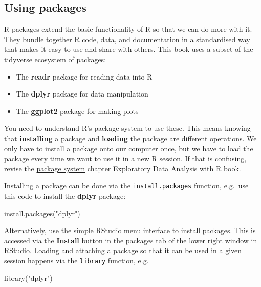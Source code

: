 \documentclass[
]{book}
\newenvironment{Shaded}{\begin{snugshade}}{\end{snugshade}}
\newcommand{\FunctionTok}[1]{\textcolor[rgb]{0.00,0.00,0.00}{#1}}
\newcommand{\NormalTok}[1]{#1}
\newcommand{\StringTok}[1]{\textcolor[rgb]{0.31,0.60,0.02}{#1}}
\providecommand{\tightlist}{%
  \setlength{\itemsep}{0pt}\setlength{\parskip}{0pt}}
\begin{document}
\hypertarget{using-packages}{%
\subsection*{Using packages}\label{using-packages}}

R packages extend the basic functionality of R so that we can do more with it. They bundle together R code, data, and documentation in a standardised way that makes it easy to use and share with others. This book uses a subset of the \href{https://www.tidyverse.org}{tidyverse} ecosystem of packages:

\begin{itemize}
\tightlist
\item
  The \textbf{readr} package for reading data into R
\item
  The \textbf{dplyr} package for data manipulation
\item
  The \textbf{ggplot2} package for making plots
\end{itemize}

You need to understand R's package system to use these. This means knowing that \textbf{installing} a package and \textbf{loading} the package are different operations. We only have to install a package onto our computer once, but we have to load the package every time we want to use it in a new R session. If that is confusing, revise the \href{https://tuos-bio-data-skills.github.io/intro-eda-book/packages.html}{package system} chapter Exploratory Data Analysis with R book.

Installing a package can be done via the \texttt{install.packages} function, e.g.~use this code to install the \textbf{dplyr} package:

\begin{Shaded}
\begin{Highlighting}[]
\FunctionTok{install.packages}\NormalTok{(}\StringTok{"dplyr"}\NormalTok{)}
\end{Highlighting}
\end{Shaded}

Alternatively, use the simple RStudio menu interface to install packages. This is accessed via the \textbf{Install} button in the packages tab of the lower right window in RStudio. Loading and attaching a package so that it can be used in a given session happens via the \texttt{library} function, e.g.

\begin{Shaded}
\begin{Highlighting}[]
\FunctionTok{library}\NormalTok{(}\StringTok{"dplyr"}\NormalTok{)}
\end{Highlighting}
\end{Shaded}
\end{document}
